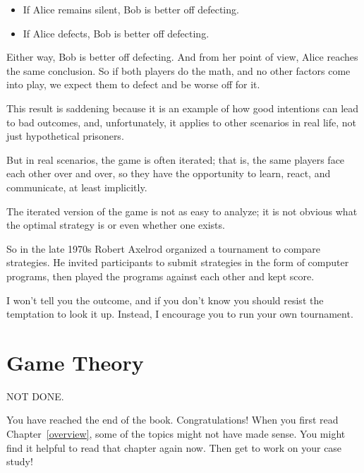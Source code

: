 \documentclass[12pt]{book}
\theoremstyle{exercise}
\begin{document}
\begin{itemize}

\item If Alice remains silent, Bob is better off defecting.

\item If Alice defects, Bob is better off defecting.

\end{itemize}

Either way, Bob is better off defecting.  And from her point of view,
Alice reaches the same conclusion.  So if both players do the math,
and no other factors come into play, we expect them to defect and be
worse off for it.


This result is saddening because it is an example of how good intentions
can lead to bad outcomes, and, unfortunately, it applies to other
scenarios in real life, not just hypothetical prisoners.

But in real scenarios, the game is often iterated; that is, the same
players face each other over and over, so they have the opportunity
to learn, react, and communicate, at least implicitly.


The iterated version of the game is not as easy to analyze; it
is not obvious what the optimal strategy is or even whether one
exists.


So in the late 1970s Robert Axelrod organized a tournament to compare
strategies.  He invited participants to submit strategies in the
form of computer programs, then played the programs against each other
and kept score.


I won't tell you the outcome, and if you don't know you should resist
the temptation to look it up.  Instead, I encourage you to run your
own tournament.  


\section{Game Theory}

NOT DONE.

You have reached the end of the book.  Congratulations!  When you
first read Chapter~\ref{overview}, some of the topics might not have
made sense.  You might find it helpful to read that chapter again now.
Then get to work on your case study!
\end{document}
